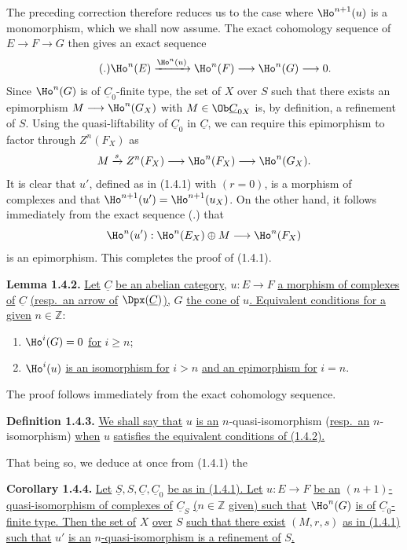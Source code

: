 The preceding correction therefore reduces us to the case where \(\Ho^{n+1}(u)\) is a monomorphism, which we shall now assume. The exact cohomology sequence of \(E\to F\to G\) then gives an exact sequence
\begin{equation}\tag{.}
  \Ho^n(E)\xrightarrow{\Ho^n(u)}
  \Ho^n(F)\longrightarrow \Ho^n(G)\longrightarrow 0.
\end{equation}
Since \(\Ho^n(G)\) is of \(\underline{C}_0\)-finite type, the set of \(X\) over \(S\) such that there exists an epimorphism \(M\longrightarrow \Ho^n(G_X)\) with \(M\in\Ob\underline{C}_{0X}\) is, by definition, a refinement of \(S\). Using the quasi-liftability of \(\underline{C}_0\) in \(\underline{C}\), we can require this epimorphism to factor through \(Z^n(F_X)\) as
\[
  M\xrightarrow{s}Z^n(F_X)\longrightarrow \Ho^n(F_X)\longrightarrow \Ho^n(G_X).
\]
It is clear that \(u'\), defined as in (1.4.1) with \((r=0)\), is a morphism of complexes and that \(\Ho^{n+1}(u')=\Ho^{n+1}(u_X)\). On the other hand, it follows immediately from the exact sequence (.) that
%
\[
  \Ho^n(u'):\Ho^n(E_X)\oplus M\longrightarrow \Ho^n(F_X)
\]
is an epimorphism. This completes the proof of (1.4.1).

\textbf{Lemma 1.4.2.} \uline{Let} \(\underline{C}\) \uline{be an abelian category,} \(u:E\to F\) \uline{a morphism of complexes of} \(\underline{C}\) \uline{(resp.\ an arrow of} \(\Dpx(\underline{C})\)\uline{),} \(G\) \uline{the cone of} \(u\)\uline{. Equivalent conditions for a given} \(n\in\mathbb Z\):
\begin{enumerate}[label=(\roman*)]
\item \(\Ho^i(G)=0\) \uline{for} \(i\geq n\);
\item \(\Ho^i(u)\) \uline{is an isomorphism for} \(i>n\) \uline{and an epimorphism for} \(i=n\).
\end{enumerate}
The proof follows immediately from the exact cohomology sequence.

\textbf{Definition 1.4.3.} \uline{We shall say that} \(u\) \uline{is an} \(n\)-quasi-isomorphism (\uline{resp.\ an} \(n\)-isomorphism) \uline{when} \(u\) \uline{satisfies the equivalent conditions of (1.4.2).}

That being so, we deduce at once from (1.4.1) the

\textbf{Corollary 1.4.4.} \uline{Let} \(\underline{S},S,\underline{C},\underline{C}_0\) \uline{be as in (1.4.1). Let} \(u:E\to F\) \uline{be an} \((n+1)\)\uline{-quasi-isomorphism of complexes of} \(\underline{C}_S\) \uline{(}\(n\in\mathbb Z\) \uline{given) such that} \(\Ho^n(G)\) \uline{is of} \(\underline{C}_0\)\uline{-finite type. Then the set of} \(X\) \uline{over} \(S\) \uline{such that there exist} \((M,r,s)\) \uline{as in (1.4.1) such that} \(u'\) \uline{is an} \(n\)\uline{-quasi-isomorphism is a refinement of} \(S\)\uline{.}

